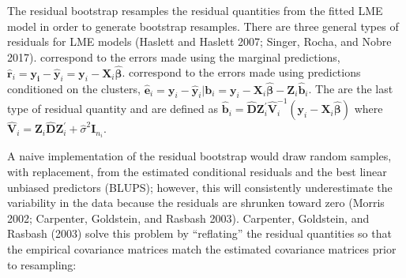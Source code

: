 The residual bootstrap resamples the residual quantities from the fitted
LME model in order to generate bootstrap resamples.
There are three general types of residuals for LME models (Haslett and Haslett 2007; Singer, Rocha, and Nobre 2017).  correspond to the errors made using the marginal predictions, \(\widehat{\boldsymbol r}_i = \boldsymbol{y_i} - \widehat{\boldsymbol{y}}_i = \boldsymbol{y}_i - \boldsymbol{X}_i \widehat{\boldsymbol{\beta}}\).  correspond to the errors made using predictions conditioned on the clusters, \(\widehat{\boldsymbol{e}}_i = \boldsymbol{y}_i - \widehat{\boldsymbol{y}}_i| \boldsymbol{b}_i = \boldsymbol{y}_i - \boldsymbol{X}_i \widehat{\boldsymbol{\beta}} - \boldsymbol{Z}_i \widehat{\boldsymbol{b}}_i\). The  are the last type of residual quantity and are defined as \(\widehat{\boldsymbol{b}}_i = \widehat{\boldsymbol{D}} \boldsymbol{Z}_i^\prime \widehat{\boldsymbol{V}}_i^{-1}\left(\boldsymbol{y}_i - \boldsymbol{X}_i \widehat{\boldsymbol{\beta}} \right)\) where \(\widehat{\boldsymbol{V}}_i = \boldsymbol{Z}_i \widehat{\boldsymbol{D}}\boldsymbol{Z}_i^\prime + \widehat{\sigma}^2 \boldsymbol{I}_{n_i}\).

A naive implementation of the residual bootstrap would draw random samples, with
replacement, from the estimated conditional residuals
and the best linear unbiased predictors (BLUPS);
however, this will consistently underestimate the variability in the
data because the residuals are shrunken toward zero
(Morris 2002; Carpenter, Goldstein, and Rasbash 2003). Carpenter, Goldstein, and Rasbash (2003) solve
this problem by ``reflating'' the residual quantities so that the empirical
covariance matrices match the estimated covariance matrices prior to resampling:

